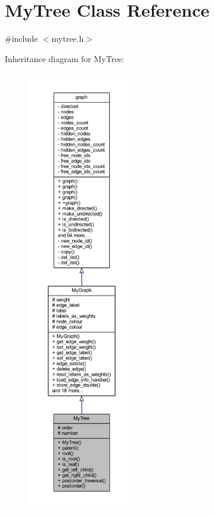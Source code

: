 \hypertarget{class_my_tree}{}\section{My\+Tree Class Reference}
\label{class_my_tree}


{\ttfamily \#include $<$mytree.\+h$>$}



Inheritance diagram for My\+Tree\+:\nopagebreak
\begin{figure}[H]
\begin{center}
\leavevmode
\includegraphics[height=550pt]{class_my_tree__inherit__graph}
\end{center}
\end{figure}


